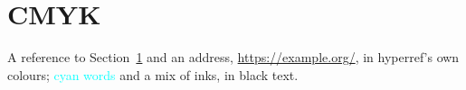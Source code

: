 \documentclass{article}
\begin{document}
\section{CMYK}\label{s:cmyk}
A reference to Section~\ref{s:cmyk} and an address, \url{https://example.org/},
in hyperref's own colours; \textcolor{cyan}{cyan words} and
\textcolor[cmyk]{0.1,0.7,0.2,0.1}{a mix of inks}, in black text.
\end{document}
